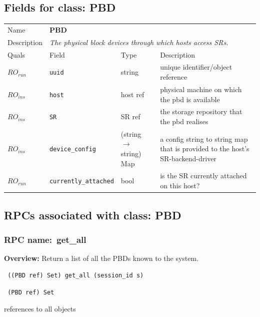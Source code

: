 \subsection{Fields for class: PBD}
\begin{longtable}{|lllp{}|}
\hline
\multicolumn{1}{|l}{Name} & \multicolumn{3}{l|}{\bf PBD} \\
\multicolumn{1}{|l}{Description} & \multicolumn{3}{l|}{\parbox{11cm}{\em
The physical block devices through which hosts access SRs.}} \\
\hline
Quals & Field & Type & Description \\
\hline
$\mathit{RO}_\mathit{run}$ &  {\tt uuid} & string & unique identifier/object reference \\
$\mathit{RO}_\mathit{ins}$ &  {\tt host} & host ref & physical machine on which the pbd is available \\
$\mathit{RO}_\mathit{ins}$ &  {\tt SR} & SR ref & the storage repository that the pbd realises \\
$\mathit{RO}_\mathit{ins}$ &  {\tt device\_config} & (string $\rightarrow$ string) Map & a config string to string map that is provided to the host's SR-backend-driver \\
$\mathit{RO}_\mathit{run}$ &  {\tt currently\_attached} & bool & is the SR currently attached on this host? \\
\hline
\end{longtable}
\subsection{RPCs associated with class: PBD}
\subsubsection{RPC name:~get\_all}

{\bf Overview:} 
Return a list of all the PBDs known to the system.

\begin{verbatim} ((PBD ref) Set) get_all (session_id s)\end{verbatim}


\vspace{0.3cm}

{\tt 
(PBD ref) Set
}


references to all objects
\vspace{0.3cm}
\vspace{0.3cm}
\vspace{0.3cm}
